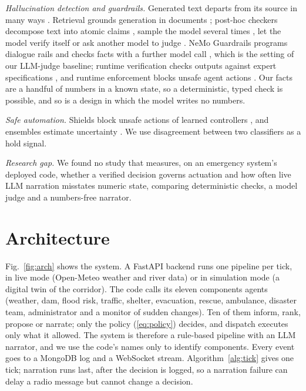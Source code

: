 \documentclass[conference]{IEEEtran}
\begin{document}
\textit{Hallucination detection and guardrails.} Generated text departs from its source in many ways \cite{Ji2023}. Retrieval grounds generation in documents \cite{Lewis2020}; post-hoc checkers decompose text into atomic claims \cite{Min2023}, sample the model several times \cite{Manakul2023}, let the model verify itself \cite{Dhuliawala2024} or ask another model to judge \cite{Zheng2023}. NeMo Guardrails programs dialogue rails and checks facts with a further model call \cite{Rebedea2023}, which is the setting of our LLM-judge baseline; runtime verification checks outputs against expert specifications \cite{Zhang2025}, and runtime enforcement blocks unsafe agent actions \cite{WangH2026}. Our facts are a handful of numbers in a known state, so a deterministic, typed check is possible, and so is a design in which the model writes no numbers.

\textit{Safe automation.} Shields block unsafe actions of learned controllers \cite{Alshiekh2018}, and ensembles estimate uncertainty \cite{Lakshminarayanan2017}. We use disagreement between two classifiers as a hold signal.

\textit{Research gap.} We found no study that measures, on an emergency system's deployed code, whether a verified decision governs actuation and how often live LLM narration misstates numeric state, comparing deterministic checks, a model judge and a numbers-free narrator.

\section{Architecture}
\label{sec:arch}
Fig.~\ref{fig:arch} shows the system. A FastAPI backend runs one pipeline per tick, in live mode (Open-Meteo weather and river data) or in simulation mode (a digital twin of the corridor). The code calls its eleven components agents (weather, dam, flood risk, traffic, shelter, evacuation, rescue, ambulance, disaster team, administrator and a monitor of sudden changes). Ten of them inform, rank, propose or narrate; only the policy (\ref{eq:policy}) decides, and dispatch executes only what it allowed. The system is therefore a rule-based pipeline with an LLM narrator, and we use the code's names only to identify components. Every event goes to a MongoDB log and a WebSocket stream. Algorithm~\ref{alg:tick} gives one tick; narration runs last, after the decision is logged, so a narration failure can delay a radio message but cannot change a decision.
\end{document}
